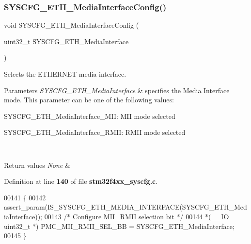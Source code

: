\subsubsection{S\+Y\+S\+C\+F\+G\+\_\+\+E\+T\+H\+\_\+\+Media\+Interface\+Config()}
{\footnotesize\ttfamily void S\+Y\+S\+C\+F\+G\+\_\+\+E\+T\+H\+\_\+\+Media\+Interface\+Config (\begin{DoxyParamCaption}\item[{uint32\+\_\+t}]{S\+Y\+S\+C\+F\+G\+\_\+\+E\+T\+H\+\_\+\+Media\+Interface }\end{DoxyParamCaption})}



Selects the E\+T\+H\+E\+R\+N\+ET media interface. 


\begin{DoxyParams}{Parameters}
{\em S\+Y\+S\+C\+F\+G\+\_\+\+E\+T\+H\+\_\+\+Media\+Interface} & specifies the Media Interface mode. This parameter can be one of the following values\+: \begin{DoxyItemize}
\item S\+Y\+S\+C\+F\+G\+\_\+\+E\+T\+H\+\_\+\+Media\+Interface\+\_\+\+M\+II\+: M\+II mode selected \item S\+Y\+S\+C\+F\+G\+\_\+\+E\+T\+H\+\_\+\+Media\+Interface\+\_\+\+R\+M\+II\+: R\+M\+II mode selected \end{DoxyItemize}
\\
\hline
\end{DoxyParams}

\begin{DoxyRetVals}{Return values}
{\em None} & \\
\hline
\end{DoxyRetVals}


Definition at line \textbf{ 140} of file \textbf{ stm32f4xx\+\_\+syscfg.\+c}.


\begin{DoxyCode}
00141 \{ 
00142   assert_param(IS_SYSCFG_ETH_MEDIA_INTERFACE(SYSCFG\_ETH\_MediaInterface)); 
00143   \textcolor{comment}{/* Configure MII\_RMII selection bit */} 
00144   *(\_\_IO uint32\_t *) PMC_MII_RMII_SEL_BB = SYSCFG\_ETH\_MediaInterface; 
00145 \}
\end{DoxyCode}
\mbox{\label{group__SYSCFG__Private__Functions_gafedab1f64cef720aeafeafd409ba6ae7}} 

